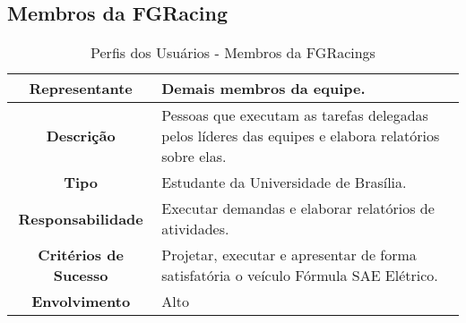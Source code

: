 \begin{apendicesenv}
\subsection{Membros da FGRacing}
\begin{table}[!h]
  \centering
  \caption{Perfis dos Usuários - Membros da FGRacings}
  \begin{tabular}{|c|l|}
  \hline
  \textbf{Representante}        & Demais membros da equipe.                                                                            \\ \hline
  \textbf{Descrição}            & \parbox[t]{11cm}{Pessoas que executam as tarefas delegadas pelos líderes das equipes e elabora relatórios sobre elas.} \\ \hline
  \textbf{Tipo}                 & Estudante da Universidade de Brasília.                                                               \\ \hline
  \textbf{Responsabilidade}     & \parbox[t]{11cm}{Executar demandas e elaborar relatórios de atividades.}                                               \\ \hline
  \textbf{Critérios de Sucesso} & \parbox[t]{11cm}{Projetar, executar e apresentar de forma satisfatória o veículo Fórmula SAE Elétrico.}                \\ \hline
  \textbf{Envolvimento}         & Alto                                                                                                 \\ \hline
  \end{tabular}
\end{table}


\end{apendicesenv}
